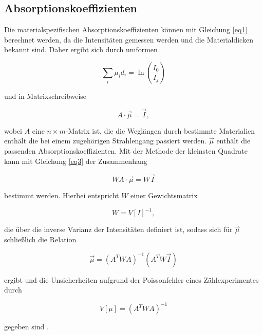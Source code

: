 \subsection{Absorptionskoeffizienten}
\label{sec:Absorp}

Die materialspezifischen Absorptionskoeffizienten können mit Gleichung \eqref{eq1} 
berechnet werden, da die Intensitäten gemessen werden und die Materialdicken bekannt sind.
Daher ergibt sich durch umformen


\begin{equation}
	\sum_i \mu_i d_i  = \ln \left( \frac{I_0}{I_j} \right)
	\label{eq2}
\end{equation}

und in Matrixschreibweise


\begin{equation}
	A \cdot \vec{\mu} = \vec{I},
	\label{eq3}
\end{equation}

wobei $A$ eine $n \times m$-Matrix ist, die die Weglängen durch bestimmte Materialien 
enthält die bei einem zugehörigen Strahlengang passiert werden. $\vec{\mu}$ enthält die 
passenden Absorptionskoeffizienten. Mit der Methode der kleinsten Quadrate kann 
mit Gleichung \eqref{eq3} der Zusammenhang 


\begin{equation}
	WA \cdot \vec{\mu} = W \vec{I}
	\label{eq4}
\end{equation}

bestimmt werden.
Hierbei entspricht $W$ einer Gewichtsmatrix


\begin{equation}
	W = V[I]^{-1},
	\label{eq5}
\end{equation}

die über die inverse Varianz der 
Intensitäten definiert ist, sodass sich für $\vec{\mu}$ schließlich die Relation 


\begin{equation}
	\vec{\mu} = (A^{T}WA)^{-1}(A^{T}W\vec{I})
	\label{eq6}
\end{equation}

ergibt und die Unsicherheiten aufgrund der Poissonfehler eines Zählexperimentes durch


\begin{equation}
	V[\mu]= (A^{T}WA)^{-1}
	\label{eq7}
\end{equation}

gegeben sind \cite{Kerne}.
\newpage

























